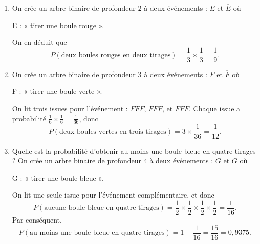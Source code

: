 {	\begin{enumerate}
		\item 
			On crée un arbre binaire de profondeur $2$ à deux événements : $E$ et $\overline{E}$ où
				\begin{center}
					E : « tirer une boule rouge ».
				\end{center}
			On en déduit que
			\[ P(\text{deux boules rouges en deux tirages}) = \frac13 \times \frac13 = \frac19. \]
		\item 
			On crée un arbre binaire de profondeur $3$ à deux événements : $F$ et $\overline{F}$ où
				\begin{center}
					F : « tirer une boule verte ».
				\end{center}
			On lit trois issues pour l'événement : $FF\overline{F}$, $F\overline{F}F$, et $\overline{F}FF$.
			Chaque issue a probabilité $\frac16 \times \frac16 = \frac1{36}$, donc
			\[ P(\text{deux boules vertes en trois tirages}) = 3\times \frac1{36} = \frac1{12}. \]
		\item Quelle est la probabilité d'obtenir au moins une boule bleue en quatre tirages ?
			On crée un arbre binaire de profondeur $4$ à deux événements : $G$ et $\overline{G}$ où
				\begin{center}
					G : « tirer une boule bleue ».
				\end{center}
			On lit une seule issue pour l'événement complémentaire, et donc
			\[ P(\text{aucune boule bleue en quatre tirages}) = \frac12\times\frac12\times\frac12\times\frac12= \frac{1}{16}. \]
			Par conséquent, 
			\[ P(\text{au moins une boule bleue en quatre tirages}) =1- \frac{1}{16} = \frac{15}{16} = 0,9375. \]
	\end{enumerate}
}

